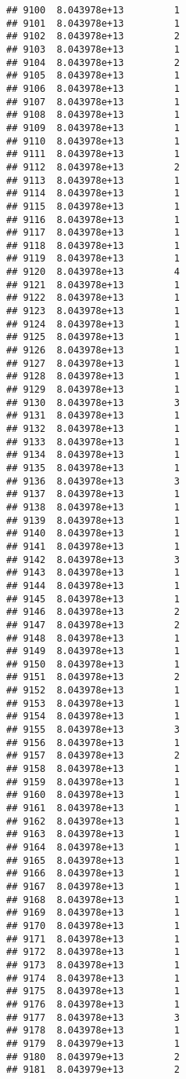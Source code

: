 \documentclass[
]{article}
\begin{document}
\begin{verbatim}
## 9100  8.043978e+13         1
## 9101  8.043978e+13         1
## 9102  8.043978e+13         2
## 9103  8.043978e+13         1
## 9104  8.043978e+13         2
## 9105  8.043978e+13         1
## 9106  8.043978e+13         1
## 9107  8.043978e+13         1
## 9108  8.043978e+13         1
## 9109  8.043978e+13         1
## 9110  8.043978e+13         1
## 9111  8.043978e+13         1
## 9112  8.043978e+13         2
## 9113  8.043978e+13         1
## 9114  8.043978e+13         1
## 9115  8.043978e+13         1
## 9116  8.043978e+13         1
## 9117  8.043978e+13         1
## 9118  8.043978e+13         1
## 9119  8.043978e+13         1
## 9120  8.043978e+13         4
## 9121  8.043978e+13         1
## 9122  8.043978e+13         1
## 9123  8.043978e+13         1
## 9124  8.043978e+13         1
## 9125  8.043978e+13         1
## 9126  8.043978e+13         1
## 9127  8.043978e+13         1
## 9128  8.043978e+13         1
## 9129  8.043978e+13         1
## 9130  8.043978e+13         3
## 9131  8.043978e+13         1
## 9132  8.043978e+13         1
## 9133  8.043978e+13         1
## 9134  8.043978e+13         1
## 9135  8.043978e+13         1
## 9136  8.043978e+13         3
## 9137  8.043978e+13         1
## 9138  8.043978e+13         1
## 9139  8.043978e+13         1
## 9140  8.043978e+13         1
## 9141  8.043978e+13         1
## 9142  8.043978e+13         3
## 9143  8.043978e+13         1
## 9144  8.043978e+13         1
## 9145  8.043978e+13         1
## 9146  8.043978e+13         2
## 9147  8.043978e+13         2
## 9148  8.043978e+13         1
## 9149  8.043978e+13         1
## 9150  8.043978e+13         1
## 9151  8.043978e+13         2
## 9152  8.043978e+13         1
## 9153  8.043978e+13         1
## 9154  8.043978e+13         1
## 9155  8.043978e+13         3
## 9156  8.043978e+13         1
## 9157  8.043978e+13         2
## 9158  8.043978e+13         1
## 9159  8.043978e+13         1
## 9160  8.043978e+13         1
## 9161  8.043978e+13         1
## 9162  8.043978e+13         1
## 9163  8.043978e+13         1
## 9164  8.043978e+13         1
## 9165  8.043978e+13         1
## 9166  8.043978e+13         1
## 9167  8.043978e+13         1
## 9168  8.043978e+13         1
## 9169  8.043978e+13         1
## 9170  8.043978e+13         1
## 9171  8.043978e+13         1
## 9172  8.043978e+13         1
## 9173  8.043978e+13         1
## 9174  8.043978e+13         1
## 9175  8.043978e+13         1
## 9176  8.043978e+13         1
## 9177  8.043978e+13         3
## 9178  8.043978e+13         1
## 9179  8.043979e+13         1
## 9180  8.043979e+13         2
## 9181  8.043979e+13         2

\end{verbatim}
\end{document}
